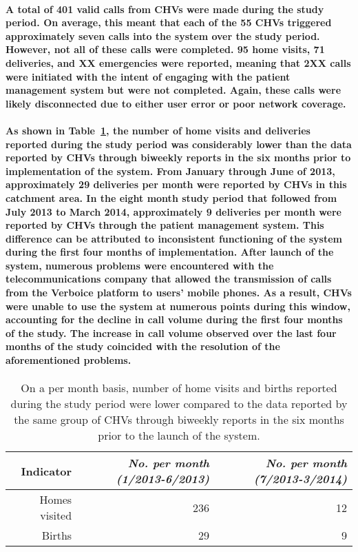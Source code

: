 \paragraph{A total of 401 valid calls from CHVs were made during the study period. On average, this meant that each of the 55 CHVs triggered approximately seven calls into the system over the study  period. However, not all of these calls were completed. 95 home visits, 71 deliveries, and XX emergencies were reported, meaning that 2XX calls were initiated with the intent of engaging with the patient management system but were not completed. Again, these calls were likely disconnected due to either user error or poor network coverage.}

\paragraph{As shown in Table~\ref{tab:usagevsreport}, the number of home visits and deliveries reported during the study period was considerably lower than the data reported by CHVs through biweekly reports in the six months prior to implementation of the system. From January through June of 2013,  approximately 29 deliveries per month were reported by CHVs in this catchment area. In the eight month study period that followed from July 2013 to March 2014, approximately 9 deliveries per month were reported by CHVs through the patient management system. This difference can be attributed to inconsistent functioning of the system during the first four months of implementation. After launch of the system, numerous problems were encountered with the telecommunications company that allowed the transmission of calls from the Verboice platform to users' mobile phones. As a result, CHVs were unable to use the system at numerous points during this window, accounting for the decline in call volume during the first four months of the study. The increase in call volume observed over the last four months of the study coincided with the resolution of the aforementioned problems.}

\begin{table}[h]
  \centering
  \caption[Comparison of CHV report data from biweekly reports vs. patient management system reports]{On a per month basis, number of home visits and births reported during the study period were lower compared to the data reported by the same group of CHVs through biweekly reports in the six months prior to the launch of the system.}
    \begin{tabular}{rrr}
    \toprule
    \textbf{Indicator} & \textit{No. per month (1/2013-6/2013)} & \textit{No. per month (7/2013-3/2014)} \\
    \midrule
    Homes visited & 236   & 12 \\
    Births & 29    & 9 \\
    \bottomrule
    \end{tabular}%
  \label{tab:usagevsreport}%
\end{table}%

